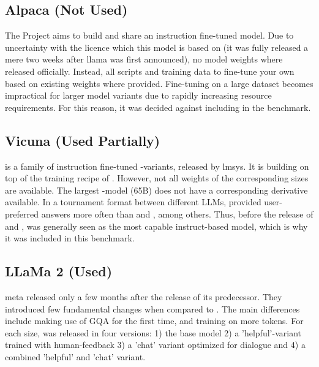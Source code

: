 \subsection{Alpaca (Not Used)}\label{sub:alpaca}
The  Project \cite{tatsulab_2023} aims to build and share an instruction fine-tuned  model.
Due to uncertainty with the  licence which this model is based on (it was fully released a mere two weeks after \gls{llama} was first announced), no model weights where released officially.
Instead, all scripts and training data to fine-tune your own  based on existing  weights where provided.
Fine-tuning on a large dataset becomes impractical for larger model variants due to rapidly increasing resource requirements.
For this reason, it was decided against including  in the benchmark.


\subsection{Vicuna (Used Partially)}\label{sub:vicuna}
 is a family of instruction fine-tuned -variants, released by \gls{lmsys}. It is building on top of the training recipe of .
However, not all weights of the corresponding  sizes are available.
The largest -model (65B) does not have a corresponding  derivative available.
In a tournament format between different \glspl{LLM},  provided user-preferred answers more often than  and  \cite{zheng_judging_2023}, among others.
Thus, before the release of  and ,  was generally seen as the most capable instruct-based model, which is why it was included in this benchmark.


\subsection{LLaMa 2 (Used)}\label{sub:llama2}
\gls{meta} released  \cite{touvron_llama2_2023} only a few months after the release of its predecessor.
They introduced few fundamental changes when compared to .
The main differences include making use of \gls{GQA} for the first time, and training on more tokens.
For each size,  was released in four versions: 1) the base model 2) a 'helpful'-variant trained with human-feedback 3) a 'chat' variant optimized for dialogue and 4) a combined 'helpful' and 'chat' variant.


